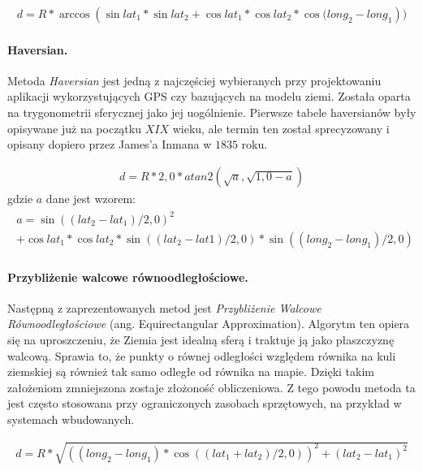 \begin{align*}
    d=R * \arccos{(\sin{lat_{1}} * \sin{lat_{2}} + \cos{lat_{1}} * \cos{lat_{2}} * \cos{(long_{2} - long_{1}}))}
\end{align*}


\paragraph{Haversian.} Metoda \textit{Haversian} \cite{haversine,distance_geo} jest jedną z najczęściej wybieranych przy projektowaniu aplikacji wykorzystujących GPS czy bazujących na modelu ziemi. Została oparta na trygonometrii sferycznej jako jej uogólnienie. Pierwsze tabele haversianów były opisywane już na początku $XIX$ wieku, ale termin ten został sprecyzowany i opisany dopiero przez James'a Inmana w $1835$ roku.

\begin{align*}
    d=R * 2,0 * atan2(\sqrt{a}, \sqrt{1,0 - a})
\end{align*}
gdzie $a$ dane jest wzorem:
\begin{align*} \label{eq:formula}
\begin{gathered}
a = \sin{((lat_{2} - lat_{1})/2,0)}^{2} \\
    + \cos{lat_{1}} * \cos{lat_{2}} * \sin{((lat_{2} - lat{1}) / 2,0)}* \sin{((long_{2} - long_{1})/2,0)} 
\end{gathered}
\end{align*}

\paragraph{Przybliżenie walcowe równoodległościowe.} Następną z zaprezentowanych metod jest \textit{Przybliżenie Walcowe Równoodległościowe} (ang. Equirectangular Approximation). \cite{distance_geo} Algorytm ten opiera się na uproszczeniu, że Ziemia jest idealną sferą i traktuje ją jako płaszczyznę walcową. Sprawia to, że punkty o równej odległości względem równika na kuli ziemskiej są również tak samo odległe od równika na mapie. Dzięki takim założeniom zmniejszona zostaje złożoność obliczeniowa. Z tego powodu metoda ta jest często stosowana przy ograniczonych zasobach sprzętowych, na przykład w systemach wbudowanych.

\begin{align*}
d=R * \sqrt{((long_{2} - long_{1})*\cos{((lat_{1} + lat_{2})/2,0)})^{2} + (lat_{2}-lat_{1})^{2}}
\end{align*} 

